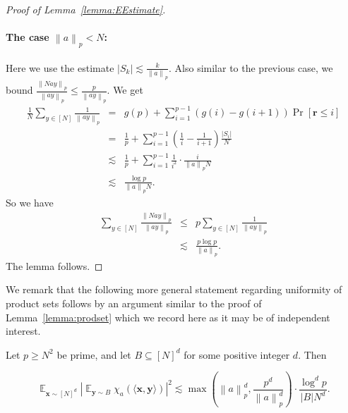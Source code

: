 \documentclass{toc}
\DeclareMathOperator{\Ex}{{\mathbb E}}
\newcommand{\x}{\mathbf{x}}
\newcommand{\y}{\mathbf{y}}
\newcommand{\Br}{\mathbf{r}}   %
\newcommand{\ip}[1]{\langle #1 \rangle}
\newcommand{\norm}[1]{\left\| #1 \right\|_p}
\begin{document}
\begin{proof}[Proof of Lemma~\ref{lemma:EEstimate}]
\paragraph{The case $ \norm{a} < N$:}

Here we use the estimate $|S_k|\lesssim \frac{k}{\norm{a}}$. Also similar to the previous case, we bound $\frac{\norm{Nay}}{\norm{ay}}\leq \frac{p}{\norm{ay}}$.
We get
	\begin{eqnarray*}
\frac{1}{N}	\sum_{y \in [N]} \frac{1}{\norm{ay}}
		&=& g(p)+ \sum_{i=1}^{p-1} \left(g(i)-g(i+1)\right) \Pr[\Br  \leq i]\\
		&=& \frac{1}{p} + \sum_{i=1}^{p-1} \left(\frac{1}{i}-\frac{1}{i+1}\right) \frac{|S_i|}{N}\\
		&\lesssim& \frac{1}{p} + \sum_{i=1}^{p-1} \frac{1}{i^2} \cdot \frac{i}{\norm{a} N}\\
		&\lesssim&\frac{\log p}{\norm{a}N}.
  \end{eqnarray*}
  So we have
\begin{eqnarray*}
	\sum_{y \in [N]} \frac{\norm{Nay}}{\norm{ay}}
	&\leq& p\sum_{y \in [N]} \frac{1}{\norm{ay}}\\
	&\lesssim& \frac{p\log p}{\norm{a}}.
  \end{eqnarray*}
The lemma follows.
%
%
%
%
%
%
%
%
%
%
%
%
\end{proof}

We remark that the following more general statement regarding uniformity of product sets follows by %
an argument similar to the proof of %
%
%
%
Lemma~\ref{lemma:prodset} which we record here as it may be of independent interest.

\begin{lemma}\label{lemma:genprodset}
 Let $p \ge  N^2$ be prime, and  let $B \subseteq [N]^d$ for some positive integer $d$. Then
	
$$	 \Ex_{\x \sim [N]^d}  |\Ex_{\y \sim B} \chi_a(\ip{\x,\y })|^2  \lesssim \max\left(\norm{a}^d,\frac{p^d }{\norm{a}^d}\right) \cdot \frac{ \log^d p}{|B|N^d}.$$
\end{lemma}




%
%
%

\end{document}
